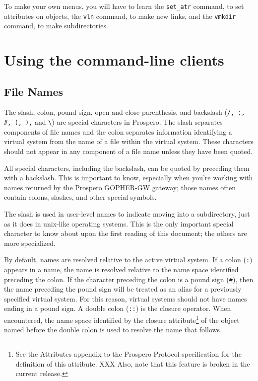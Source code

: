 To make your own menus, you will have to learn the {\tt set\_atr}
command, to set attributes on objects, the {\tt vln} command, to make
new links, and the {\tt vmkdir} command, to make subdirectories.

\section{Using the command-line clients}

\subsection{File Names}

The slash, colon, pound sign, open and close parenthesis, and backslash
({\tt /, :, \#, (, ),} and \verb"\") are special characters in
Prospero.  The slash separates components of file names and the colon
separates information identifying a virtual system from the name of a
file within the virtual system.  These characters should not appear in
any component of a file name unless they have been quoted.

All special characters, including the backslash, can be quoted by
preceding them with a backslash.  This is important to know,
especially when you're working with names returned by the Prospero
GOPHER-GW gateway; those names often contain colons, slashes, and other special
symbols.

The slash is used in user-level names to indicate moving into a
subdirectory, just as it does in {\sc unix}-like operating systems.
This is the only important special character to know about upon the
first reading of this document; the others are more specialized.

By default, names are resolved relative to the active virtual system.
If a colon ({\tt :}) appears in a name, the name is resolved relative
to the name space identified preceding the colon.  If the character
preceding the colon is a pound sign ({\tt \#}), then the name
preceding the pound sign will be treated as an alias for a previously
specified virtual system.  For this reason, virtual systems should not
have names ending in a pound sign.  A double colon ({\tt ::}) is the
closure operator.  When encountered, the name space identified by the
{\sc closure} attribute\footnote{See the Attributes appendix to the Prospero
Protocol specification for the definition of this attribute.  XXX
Also, note that this feature is broken in the current release.} of the
object named before the double colon is used to resolve the name that
follows.

